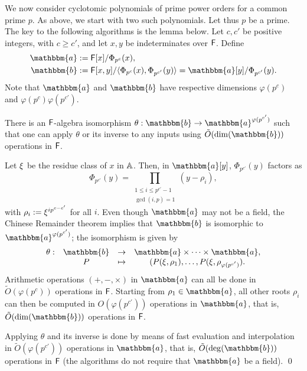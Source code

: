 We now consider cyclotomic polynomials of prime power
orders for a common prime $p$. As above, we start with two such polynomials.
Let thus $p$ be a prime. The key to the following algorithms is the
lemma below.  Let $c,c'$ be positive integers, with $c \ge
c'$, and let $x,y$ be indeterminates over ${\mathsf{F}}$. Define
\begin{align}
\mathbbm{a}&:=\F[x]/\Phi_{p^c}(x),  \\
\mathbbm{b}&:=\F[x,y]/\langle \Phi_{p^c}(x), \Phi_{p^{c'}}(y)\rangle = \mathbbm{a}[y]/\Phi_{p^{c'}}(y).
\end{align}
Note that $\mathbbm{a}$ and $\mathbbm{b}$ have respective dimensions
$\varphi(p^c)$ and $\varphi(p^c) \varphi(p^{c'})$.
\begin{lemma}
  There is an ${\mathsf{F}}$-algebra isomorphism $\theta: \mathbbm{b} \to
  \mathbbm{a}^{\varphi(p^{c'})}$ such that one can apply $\theta$ or
  its inverse to any inputs using $\tilde{O}(\dim(\mathbbm{b}))$ operations in ${\mathsf{F}}$.
\end{lemma}
  Let $\xi$ be the residue class of
  $x$ in $\mathbb{A}$. Then, in $\mathbbm{a}[y]$, $\Phi_{p^{c'}}(y)$ factors as
  $$\Phi_{p^{c'}}(y) =\prod_{\substack{1 \le i\le p^{c'}-1\\ \gcd(i,p)
      =1}} (y-\rho_i),$$ with $\rho_i:={\xi}^{i p^{c-c'}}$ for all
  $i$.  Even though $\mathbbm{a}$ may not be a field, the Chinese
  Remainder theorem implies that $\mathbbm{b}$ is isomorphic to
  $\mathbbm{a}^{\varphi(p^{c'})}$; the isomorphism is given by
  $$\begin{array}{cccc}
    \theta: & \mathbbm{b} & \to & \mathbbm{a} \times \cdots \times \mathbbm{a}, \\
    & P & \mapsto& (P(\xbar,\rho_1),\dots,P(\xbar,\rho_{\varphi(p^{c'})}).
  \end{array}$$
  Arithmetic operations $(+,-,\times)$ in
  $\mathbbm{a}$ can all be done in $\tilde{O}(\varphi(p^c))$ operations
  in ${\mathsf{F}}$. Starting from $\rho_1 \in \mathbbm{a}$, all other roots
  $\rho_i$ can then be computed in $O(\varphi(p^{c'}))$ operations in
  $\mathbbm{a}$, that is, $\tilde{O}(\dim(\mathbbm{b}))$
  operations in ${\mathsf{F}}$. 
  
Applying $\theta$ and its inverse is done by means of fast evaluation
and interpolation~\cite[Chapter~10]{vzGathen13} in $\tilde{O}(\varphi(p^{c'}))$
operations in $\mathbbm{a}$, that is, $\tilde{O}(\deg(\mathbbm{b}))$ operations in ${\mathsf{F}}$
(the algorithms do not require that $\mathbbm{a}$ be a field).
\qed

